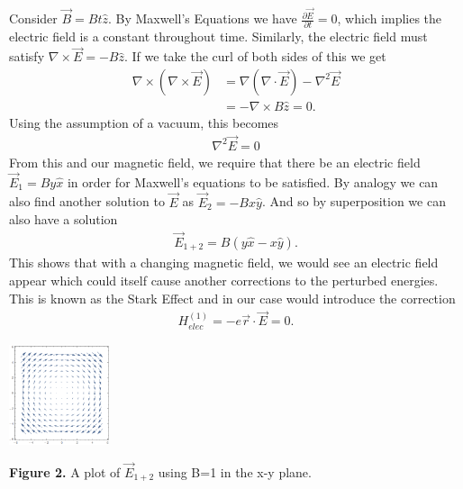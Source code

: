 \documentclass[landscape,a0paper,fontscale=0.285]{baposter} %
\begin{document}
\begin{poster}
{\begin{multicols}{3}
Consider $\vec{B} = Bt \hat{z}$. By Maxwell's Equations we have $\frac{\partial \vec{E}}{\partial t} = 0$, which implies the electric field is a constant throughout time. Similarly, the electric field must satisfy $\nabla \times \vec{E} = -B \hat{z}$. If we take the curl of both sides of this we get
\begin{align*}
\nabla \times(\nabla \times \vec{E}) &= \nabla (\nabla \cdot \vec{E})- \nabla^2 \vec{E} \\ &= -\nabla \times B \hat{z} =0.
\end{align*}
Using the assumption of a vacuum, this becomes 
\begin{align*}
\nabla^2 \vec{E} =  0 \label{del^2 E=0}
\end{align*}
From this and our magnetic field, we require that there be an electric field $\vec{E}_1=By \hat{x}$ in order for Maxwell's equations to be satisfied. By analogy we can also find another solution to $\vec{E}$ as $\vec{E}_2 = -Bx\hat{y}$. And so by superposition we can also have a solution
\begin{align}
\vec{E}_{1+2} = B(y \hat{x}-x\hat{y}).
\end{align}
This shows that with a changing magnetic field, we would see an electric field appear which could itself cause another corrections to the perturbed energies. This is known as the Stark Effect and in our case would introduce the correction
\begin{align}
H_{elec}^{(1)}=-e\vec{r}\cdot\vec{E}=0.
\end{align} 

\begin{center}
	\includegraphics[width=0.22\textwidth]{E1plus2.png}
	
	{\footnotesize \textbf{Figure 2.} A plot of $\vec{E}_{1+2}$ using B=1 in the x-y plane.}
\end{center}
\end{multicols}
}



\end{poster}
\end{document}
